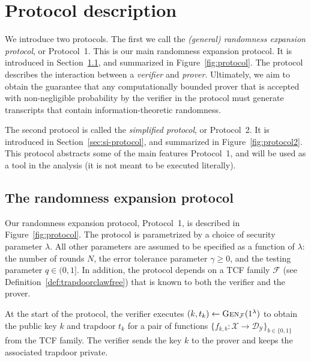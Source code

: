 \documentclass[11pt]{article}
\theoremstyle{remark}
\theoremstyle{definition}
\newcommand{\mD}{\ensuremath{\mathcal{D}}}
\newcommand{\mF}{\ensuremath{\mathcal{F}}}
\newcommand{\mX}{\ensuremath{\mathcal{X}}}
\newcommand{\mY}{\ensuremath{\mathcal{Y}}}
\newcommand{\Gen}{\textsc{Gen}}
\begin{document}


\section{Protocol description}
\label{sec:protocol}

We introduce two protocols. The first we call the \emph{(general) randomness expansion protocol}, or Protocol~1. This is our main randomness expansion protocol. It is introduced in Section~\ref{sec:re-protocol}, and summarized in Figure~\ref{fig:protocol}. The protocol describes the interaction between a \emph{verifier} and \emph{prover}. Ultimately, we aim to obtain the guarantee that any computationally bounded prover that is accepted with non-negligible probability by the verifier in the protocol must generate transcripts that contain information-theoretic randomness. 

The second protocol is called the \emph{simplified protocol}, or Protocol~2. It is introduced in Section~\ref{sec:si-protocol}, and summarized in Figure~\ref{fig:protocol2}. This protocol abstracts some of the main features Protocol~1, and will be used as a tool in the analysis (it is not meant to be executed literally).  


\subsection{The randomness expansion protocol}
\label{sec:re-protocol}

Our randomness expansion protocol, Protocol~1, is described in Figure~\ref{fig:protocol}. The protocol is parametrized by a choice of security parameter $\lambda$. All other parameters are assumed to be specified as a function of $\lambda$: the number of rounds $N$, the error tolerance parameter $\gamma \geq 0$, and the testing parameter $q\in (0,1]$. In addition, the protocol depends on a TCF family $\mathcal{F}$ (see Definition~\ref{def:trapdoorclawfree}) that is known to both the verifier and the prover.

At the start of the protocol, the verifier executes $(k,t_k)\leftarrow \Gen_\mF(1^\lambda)$ to obtain the public key $k$ and trapdoor $t_k$ for a pair of functions $\{f_{k,b}:\mX\to \mD_\mY\}_{b\in\{0,1\}}$ from the TCF family. The verifier sends the key $k$ to the prover and keeps the associated trapdoor private. 
\end{document}
